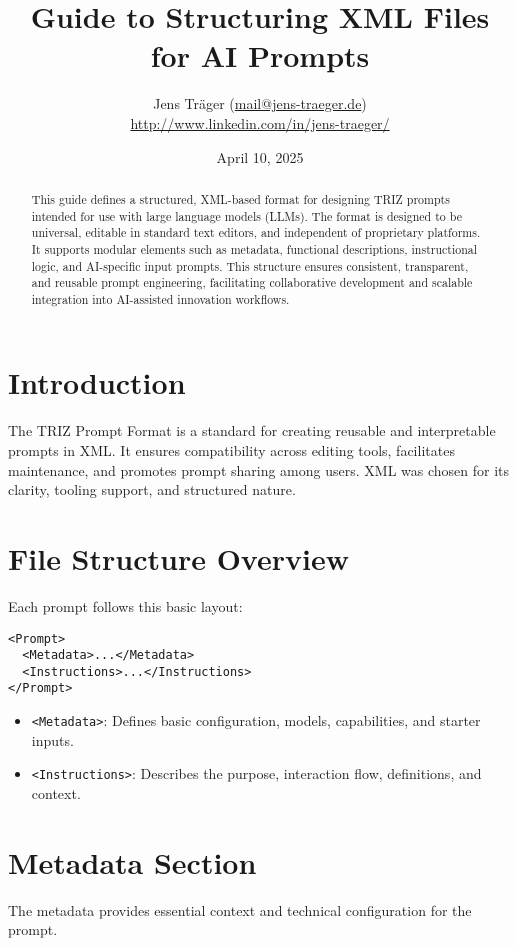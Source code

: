 \documentclass[a4paper,11pt]{refart}
\title{Guide to Structuring XML Files for AI Prompts}
\author{Jens Träger (\url{mail@jens-traeger.de})\\{\footnotesize \url{http://www.linkedin.com/in/jens-traeger/}}}
\date{April 10, 2025}
\begin{document}
\maketitle

\begin{abstract}
This guide defines a structured, XML-based format for designing TRIZ prompts intended for use with large language models (LLMs). The format is designed to be universal, editable in standard text editors, and independent of proprietary platforms. It supports modular elements such as metadata, functional descriptions, instructional logic, and AI-specific input prompts. This structure ensures consistent, transparent, and reusable prompt engineering, facilitating collaborative development and scalable integration into AI-assisted innovation workflows.
\end{abstract}

\tableofcontents
\clearpage

\section{Introduction}
The TRIZ Prompt Format is a standard for creating reusable and interpretable prompts in XML. It ensures compatibility across editing tools, facilitates maintenance, and promotes prompt sharing among users. XML was chosen for its clarity, tooling support, and structured nature.

\section{File Structure Overview}
Each prompt follows this basic layout:
\begin{lstlisting}
<Prompt>
  <Metadata>...</Metadata>
  <Instructions>...</Instructions>
</Prompt>
\end{lstlisting}

\begin{itemize}
\item \lstinline!<Metadata>!: Defines basic configuration, models, capabilities, and starter inputs.
\item \lstinline!<Instructions>!: Describes the purpose, interaction flow, definitions, and context.
\end{itemize}

\section{Metadata Section}
The metadata provides essential context and technical configuration for the prompt.
\end{document}
